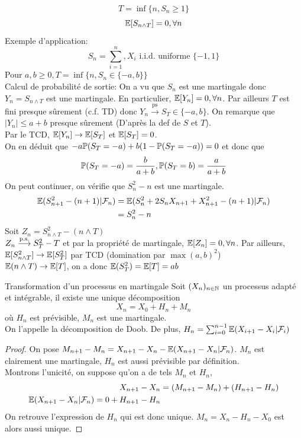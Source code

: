 \documentclass[]{report}
\begin{document}
    \begin{ex}{}{}
        \[T=\inf\{n,S_n\ge 1\}\]
        \[\mathbb{E}[S_{n\wedge T}]=0,\forall n\]
        Exemple d'application:
        \[S_n=\sum_{i=1}^{n},X_i\text{ i.i.d. uniforme }\{-1,1\}\]
        Pour $a,b\ge 0, T=\inf\{n,S_n\in \{-a,b\}\}$\\
        Calcul de probabilité de sortie: On a vu que $S_n$ est une martingale donc $Y_n=S_{n\wedge T}$ est une martingale. En particulier, $\mathbb{E}[Y_n]=0,\forall n$. Par ailleurs $T$ est fini presque sûrement (c.f. TD) donc $Y_n\overset{\text{ps}}{\longrightarrow}S_T\in \{-a,b\}$. On remarque que $\left|Y_n\right|\le a+b$ presque sûrement (D'après la def de $S$ et $T$).\\
        Par le TCD, $\mathbb{E}[Y_n]\to \mathbb{E}[S_T]$ et $\mathbb{E}[S_T]=0$.\\
        On en déduit que $-a\mathbb{P}(S_T=-a)+b(1-\mathbb{P}(S_T=-a))=0$ et donc que 
        \[\mathbb{P}(S_T=-a)=\frac{b}{a+b},\mathbb{P}(S_T=b)=\frac{a}{a+b}\]
        On peut continuer, on vérifie que $S_n^2-n$ est une martingale.
        \begin{align*}
            \mathbb{E}(S_{n+1}^2-(n+1)|\mathcal{F}_n)&=\mathbb{E}(S_n^2+2S_n X_{n+1}+X_{n+1}^2-(n+1)|\mathcal{F}_n)\\
            &=S_n^2-n
        \end{align*}
        Soit $Z_n=S_{n\wedge T}^2-(n\wedge T)$\\
        $Z_n\overset{\text{p.s.}}{\longrightarrow} S_T^2-T$ et par la propriété de martingale, $\mathbb{E}[Z_n]=0,\forall n$. Par ailleurs, $\mathbb{E}[S_{n\wedge T}^2]\to \mathbb{E}[S_T^2]$ par TCD (domination par $\max(a,b)^2$)\\
        $\mathbb{E}(n\wedge T)\to \mathbb{E}[T]$, on a donc $\mathbb{E}(S_T^2)=\mathbb{E}[T]=ab$
    \end{ex}

    \begin{prop}{Transformation d'un processus en martingale}{}
        Soit $(X_n)_{n\in\mathbb{N}}$ un processus adapté et intégrable, il existe une unique décomposition
        \[X_n=X_0+H_n+M_n\]
        où $H_n$ est prévisible, $M_n$ est une martingale.\\
        On l'appelle la décomposition de Doob. De plus, $H_n=\sum_{i=0}^{n-1}\mathbb{E}(X_{i+1}-X_i|\mathcal{F}_i)$
    \end{prop}

    \begin{proof}
        On pose $M_{n+1}-M_n=X_{n+1}-X_n-\mathbb{E}(X_{n+1}-X_n|\mathcal{F}_n)$. $M_n$ est clairement une martingale, $H_n$ est aussi prévisible par définition.\\
        Montrons l'unicité, on suppose qu'on a de tels $M_n$ et $H_n$,
        \begin{align*}
            X_{n+1}-X_n&=(M_{n+1}-M_n)+(H_{n+1}-H_n)\\
            \mathbb{E}(X_{n+1}-X_n|\mathcal{F}_n)=0+H_{n+1}-H_n
        \end{align*}
        On retrouve l'expression de $H_n$ qui est donc unique. $M_n=X_n-H_n-X_0$ est alors aussi unique.
    \end{proof}
\end{document}
